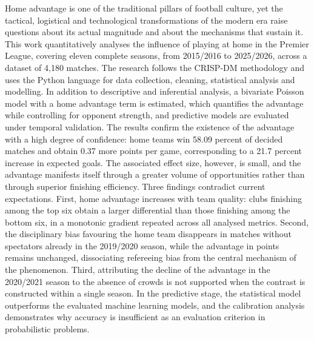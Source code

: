 
\begin{abstractutfpr}%
Home advantage is one of the traditional pillars of football culture, yet the
tactical, logistical and technological transformations of the modern era raise
questions about its actual magnitude and about the mechanisms that sustain it.
This work quantitatively analyses the influence of playing at home in the
Premier League, covering eleven complete seasons, from 2015/2016 to 2025/2026,
across a dataset of 4,180 matches. The research follows the CRISP-DM methodology
and uses the Python language for data collection, cleaning, statistical analysis
and modelling. In addition to descriptive and inferential analysis, a bivariate
Poisson model with a home advantage term is estimated, which quantifies the
advantage while controlling for opponent strength, and predictive models are
evaluated under temporal validation. The results confirm the existence of the
advantage with a high degree of confidence: home teams win 58.09 percent of
decided matches and obtain 0.37 more points per game, corresponding to a 21.7
percent increase in expected goals. The associated effect size, however, is
small, and the advantage manifests itself through a greater volume of
opportunities rather than through superior finishing efficiency. Three findings
contradict current expectations. First, home advantage increases with team
quality: clubs finishing among the top six obtain a larger differential than
those finishing among the bottom six, in a monotonic gradient repeated across
all analysed metrics. Second, the disciplinary bias favouring the home team
disappears in matches without spectators already in the 2019/2020 season, while
the advantage in points remains unchanged, dissociating refereeing bias from the
central mechanism of the phenomenon. Third, attributing the decline of the
advantage in the 2020/2021 season to the absence of crowds is not supported when
the contrast is constructed within a single season. In the predictive stage, the
statistical model outperforms the evaluated machine learning models, and the
calibration analysis demonstrates why accuracy is insufficient as an evaluation
criterion in probabilistic problems.
\end{abstractutfpr}
